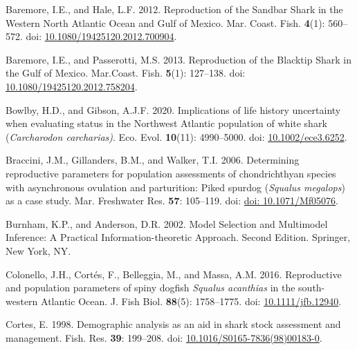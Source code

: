 \documentclass[
]{article}
\newenvironment{CSLReferences}%
  {}%
  {\par}
\begin{document}
\label{refs}
\begin{CSLReferences}{1}{0}
Baremore, I.E., and Hale, L.F. 2012. Reproduction of the {Sandbar} {Shark} in the {Western} {North} {Atlantic} {Ocean} and {Gulf} of {Mexico}. Mar. Coast. Fish. \textbf{4}(1): 560--572. doi: \href{https://doi.org/10.1080/19425120.2012.700904}{10.1080/19425120.2012.700904}.

Baremore, I.E., and Passerotti, M.S. 2013. Reproduction of the {Blacktip} {Shark} in the {Gulf} of {Mexico}. Mar.Coast. Fish. \textbf{5}(1): 127--138. doi: \href{https://doi.org/10.1080/19425120.2012.758204}{10.1080/19425120.2012.758204}.

Bowlby, H.D., and Gibson, A.J.F. 2020. Implications of life history uncertainty when evaluating status in the {Northwest} {Atlantic} population of white shark (\emph{{Carcharodon} carcharias)}. Eco. Evol. \textbf{10}(11): 4990--5000. doi: \href{https://doi.org/10.1002/ece3.6252}{10.1002/ece3.6252}.

Braccini, J.M., Gillanders, B.M., and Walker, T.I. 2006. Determining reproductive parameters for population assessments of chondrichthyan species with asynchronous ovulation and parturition: Piked spurdog (\emph{{Squalus} megalops}) as a case study. Mar. Freshwater Res. \textbf{57}: 105--119. doi: \href{https://doi.org/doi:\%2010.1071/Mf05076}{doi: 10.1071/Mf05076}.

Burnham, K.P., and Anderson, D.R. 2002. Model {Selection} and {Multimodel} {Inference}: A {Practical} {Information-theoretic} {Approach}. {Second} {Edition}. Springer, New York, NY.

Colonello, J.H., Cortés, F., Belleggia, M., and Massa, A.M. 2016. Reproductive and population parameters of spiny dogfish \emph{{Squalus} acanthias} in the south-western {Atlantic} {Ocean}. J. Fish Biol. \textbf{88}(5): 1758--1775. doi: \href{https://doi.org/10.1111/jfb.12940}{10.1111/jfb.12940}.

Cortes, E. 1998. Demographic analysis as an aid in shark stock assessment and management. Fish. Res. \textbf{39}: 199--208. doi: \href{https://doi.org/10.1016/S0165-7836(98)00183-0}{10.1016/S0165-7836(98)00183-0}.


\end{CSLReferences}
\end{document}
